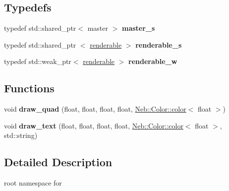\subsection*{\-Typedefs}
\begin{DoxyCompactItemize}
\item 
\hypertarget{namespaceglutpp_ad416fff92cdabdc3141618680ccd1945}{typedef std\-::shared\-\_\-ptr$<$ master $>$ {\bfseries master\-\_\-s}}\label{namespaceglutpp_ad416fff92cdabdc3141618680ccd1945}

\item 
\hypertarget{namespaceglutpp_a67ccde707354c95f87efe65589d3219d}{typedef std\-::shared\-\_\-ptr\*
$<$ \hyperlink{classglutpp_1_1renderable}{renderable} $>$ {\bfseries renderable\-\_\-s}}\label{namespaceglutpp_a67ccde707354c95f87efe65589d3219d}

\item 
\hypertarget{namespaceglutpp_ab992d93431ecb78e57041c940827dd90}{typedef std\-::weak\-\_\-ptr$<$ \hyperlink{classglutpp_1_1renderable}{renderable} $>$ {\bfseries renderable\-\_\-w}}\label{namespaceglutpp_ab992d93431ecb78e57041c940827dd90}

\end{DoxyCompactItemize}
\subsection*{\-Functions}
\begin{DoxyCompactItemize}
\item 
\hypertarget{namespaceglutpp_a7e8ef734c6531ececd6a4236ca9b38e5}{void {\bfseries draw\-\_\-quad} (float, float, float, float, \hyperlink{classNeb_1_1Color_1_1color}{\-Neb\-::\-Color\-::color}$<$ float $>$)}\label{namespaceglutpp_a7e8ef734c6531ececd6a4236ca9b38e5}

\item 
\hypertarget{namespaceglutpp_a3ab39b1c0806f2f023ecb161099b1381}{void {\bfseries draw\-\_\-text} (float, float, float, float, \hyperlink{classNeb_1_1Color_1_1color}{\-Neb\-::\-Color\-::color}$<$ float $>$, std\-::string)}\label{namespaceglutpp_a3ab39b1c0806f2f023ecb161099b1381}

\end{DoxyCompactItemize}


\subsection{\-Detailed \-Description}
root namespace for  